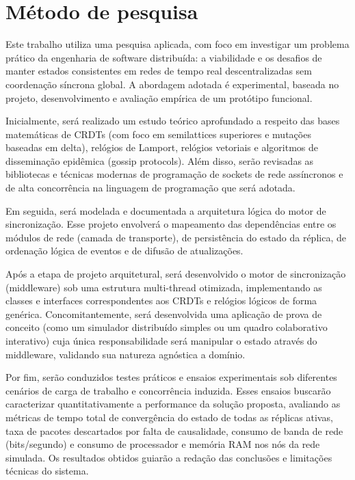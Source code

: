 \section{Método de pesquisa}

Este trabalho utiliza uma pesquisa aplicada, com foco em investigar um
problema prático da engenharia de software distribuída: a viabilidade e os
desafios de manter estados consistentes em redes de tempo real
descentralizadas sem coordenação síncrona global. A abordagem adotada é
experimental, baseada no projeto, desenvolvimento e avaliação empírica de
um protótipo funcional.

Inicialmente, será realizado um estudo teórico aprofundado a respeito das
bases matemáticas de CRDTs (com foco em semilattices superiores e mutações
baseadas em delta), relógios de Lamport, relógios vetoriais e algoritmos de
disseminação epidêmica (gossip protocols). Além disso, serão revisadas as
bibliotecas e técnicas modernas de programação de sockets de rede
assíncronos e de alta concorrência na linguagem de programação que será
adotada.

Em seguida, será modelada e documentada a arquitetura lógica do motor de
sincronização. Esse projeto envolverá o mapeamento das dependências entre
os módulos de rede (camada de transporte), de persistência do estado da
réplica, de ordenação lógica de eventos e de difusão de atualizações.

Após a etapa de projeto arquitetural, será desenvolvido o motor de
sincronização (middleware) sob uma estrutura multi-thread otimizada,
implementando as classes e interfaces correspondentes aos CRDTs e relógios
lógicos de forma genérica. Concomitantemente, será desenvolvida uma
aplicação de prova de conceito (como um simulador distribuído simples ou
um quadro colaborativo interativo) cuja única responsabilidade será
manipular o estado através do middleware, validando sua natureza agnóstica
a domínio.

Por fim, serão conduzidos testes práticos e ensaios experimentais sob
diferentes cenários de carga de trabalho e concorrência induzida. Esses
ensaios buscarão caracterizar quantitativamente a performance da solução
proposta, avaliando as métricas de tempo total de convergência do estado
de todas as réplicas ativas, taxa de pacotes descartados por falta de
causalidade, consumo de banda de rede (bits/segundo) e consumo de
processador e memória RAM nos nós da rede simulada. Os resultados obtidos
guiarão a redação das conclusões e limitações técnicas do sistema.

